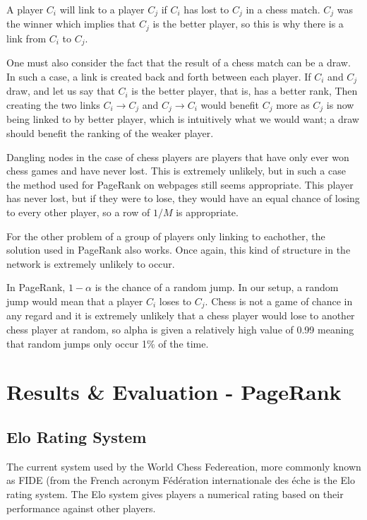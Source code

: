 \documentclass[pdftex,11pt,a4paper]{report}
\begin{document}
A player $C_i$ will link to a player $C_j$ if $C_i$ has lost to $C_j$ in a chess match. 
$C_j$ was the winner
which implies that $C_j$ is the better player, 
so this is why there is a link from $C_i$ to $C_j$.

One must also consider the fact that the result of a chess match can be a draw. 
In such a case, a link is created back and forth between each player.
If $C_i$ and $C_j$ draw, and let us say that $C_i$ is the better player, that is, has a better rank,
Then creating the two links $C_i \rightarrow C_j$ and $C_j \rightarrow C_i$ would benefit $C_j$ more 
as $C_j$ is now being linked to by better player, which is intuitively what we would want; a draw
should benefit the ranking of the weaker player.

Dangling nodes in the case of chess players are players that have only ever won chess games and have never lost.
This is extremely unlikely, but in such a case the method used for PageRank on webpages
still seems appropriate. This player has never lost, but if they were to lose, they would
have an equal chance of losing to every other player, so a row of $1 / M$ is appropriate.

For the other problem of a group of players only linking to eachother, the
solution used in PageRank also works.
Once again, this kind of structure in the network is extremely unlikely to occur.

In PageRank, $1 - \alpha$ is the chance of a random jump. In our setup, a random jump would mean
that a player $C_i$ loses to $C_j$. Chess is not a game of chance in any regard
and it is extremely unlikely that a chess player would lose 
to another chess player at random, so alpha is given a relatively high value of 0.99 meaning
that random jumps only occur 1\% of the time.

\chapter{Results \& Evaluation - PageRank}

\section{Elo Rating System}

The current system used by the World Chess Federeation, more commonly known
as FIDE (from the French acronym Fédération internationale des éche is the Elo rating system.
The Elo system gives players a numerical rating based on their performance against other players. 
\end{document}
